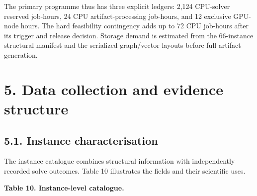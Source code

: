 \documentclass[
  british,
  10pt,
]{article}
\begin{document}
The primary programme thus has three explicit ledgers: 2,124 CPU-solver
reserved job-hours, 24 CPU artifact-processing job-hours, and 12
exclusive GPU-node hours. The hard feasibility contingency adds up to 72
CPU job-hours after its trigger and release decision. Storage demand is
estimated from the 66-instance structural manifest and the serialized
graph/vector layouts before full artifact generation.

\section{5. Data collection and evidence
structure}\label{data-collection-and-evidence-structure}

\subsection{5.1. Instance
characterisation}\label{instance-characterisation}

The instance catalogue combines structural information with
independently recorded solve outcomes. Table 10 illustrates the fields
and their scientific uses.


\textbf{Table 10. Instance-level catalogue.}
\end{document}
